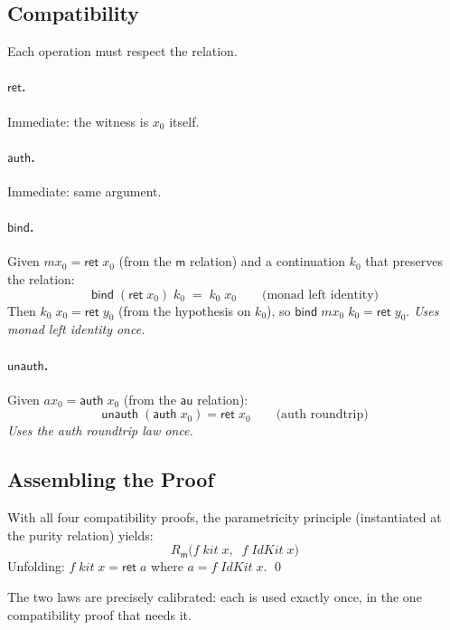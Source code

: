 \documentclass[acmsmall,screen,review,anonymous]{acmart}
\begin{document}
\subsection{Compatibility}

Each operation must respect the relation.

\paragraph{$\mathsf{ret}$.}
Immediate: the witness is $x_0$ itself.

\paragraph{$\mathsf{auth}$.}
Immediate: same argument.

\paragraph{$\mathsf{bind}$.}
Given $\mathit{mx}_0 = \mathsf{ret}\;x_0$ (from the $\mathsf{m}$
relation) and a continuation $k_0$ that preserves the relation:
\[
  \mathsf{bind}\;(\mathsf{ret}\;x_0)\;k_0
  \;=\; k_0\;x_0
  \qquad\text{(monad left identity)}
\]
Then $k_0\;x_0 = \mathsf{ret}\;y_0$ (from the hypothesis on $k_0$),
so $\mathsf{bind}\;\mathit{mx}_0\;k_0 = \mathsf{ret}\;y_0$.
\emph{Uses monad left identity once.}

\paragraph{$\mathsf{unauth}$.}
Given $\mathit{ax}_0 = \mathsf{auth}\;x_0$ (from the $\mathsf{au}$
relation):
\[
  \mathsf{unauth}\;(\mathsf{auth}\;x_0) = \mathsf{ret}\;x_0
  \qquad\text{(auth roundtrip)}
\]
\emph{Uses the auth roundtrip law once.}

\subsection{Assembling the Proof}

With all four compatibility proofs, the parametricity principle
(instantiated at the purity relation) yields:
\[
  R_{\mathsf{m}}\bigl(f\;\mathit{kit}\;x,\;\;f\;\mathit{IdKit}\;x\bigr)
\]
Unfolding: $f\;\mathit{kit}\;x = \mathsf{ret}\;a$ where
$a = f\;\mathit{IdKit}\;x$.  \qed

\medskip
The two laws are precisely calibrated: each is used exactly once, in
the one compatibility proof that needs it.
\end{document}
